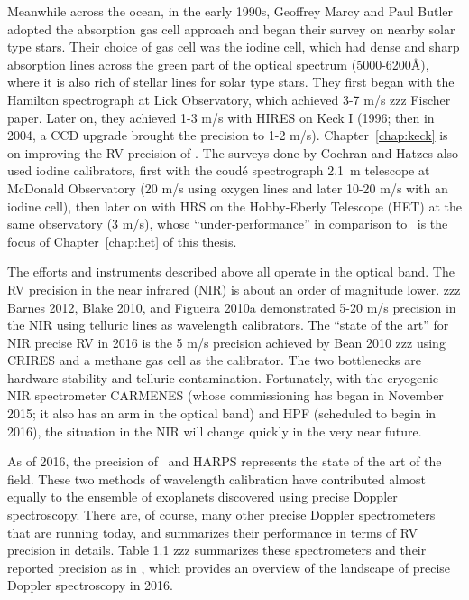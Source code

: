 Meanwhile across the ocean, in the early 1990s, Geoffrey Marcy and
Paul Butler adopted the absorption gas cell approach and began their
survey on nearby solar type stars. Their choice of gas cell was the
iodine cell, which had dense and sharp absorption lines across the
green part of the optical spectrum (5000-6200\AA), where it is also
rich of stellar lines for solar type stars. They first began with the
Hamilton spectrograph at Lick Observatory, which achieved 3-7 m/s zzz
Fischer paper. Later on, they achieved 1-3 m/s with HIRES on Keck I
(1996; then in 2004, a CCD upgrade brought the precision to 1-2
m/s). Chapter~\ref{chap:keck} is on improving the RV precision of
\keck. The surveys done by Cochran and Hatzes also used iodine
calibrators, first with the coud\'e spectrograph 2.1~m telescope at
McDonald Observatory (20 m/s using oxygen lines and later 10-20 m/s
with an iodine cell), then later on with HRS on the Hobby-Eberly
Telescope (HET) at the same observatory (3 m/s), whose
``under-performance'' in comparison to \keck\ is the focus of
Chapter~\ref{chap:het} of this thesis.

The efforts and instruments described above all operate in the optical
band. The RV precision in the near infrared (NIR) is about an order of
magnitude lower. zzz Barnes 2012, Blake 2010, and Figueira 2010a
demonstrated 5-20 m/s precision in the NIR using telluric lines as
wavelength calibrators. The ``state of the art'' for NIR precise RV in
2016 is the 5 m/s precision achieved by Bean 2010 zzz using CRIRES and
a methane gas cell as the calibrator. The two bottlenecks are hardware
stability and telluric contamination. Fortunately, with the cryogenic
NIR spectrometer CARMENES (whose commissioning has began in November
2015; it also has an arm in the optical band) and HPF (scheduled to
begin in 2016), the situation in the NIR will change quickly in the
very near future.

As of 2016, the precision of \keck\ and HARPS represents the state
of the art of the field. These two methods of wavelength calibration
have contributed almost equally to the ensemble of exoplanets
discovered using precise Doppler spectroscopy. There are, of course,
many other precise Doppler spectrometers that are running today, and
\cite{eprv2015} summarizes their performance in terms of RV
precision in details. Table 1.1 zzz summarizes these spectrometers and
their reported precision as in \cite{eprv2015}, which provides an
overview of the landscape of precise Doppler spectroscopy in 2016.

